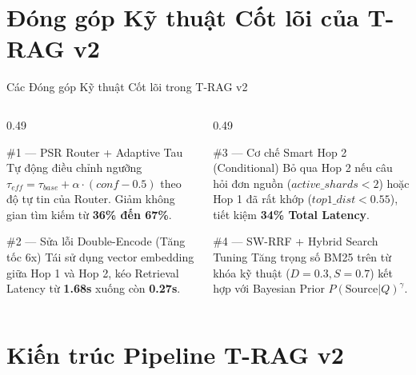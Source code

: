 \documentclass[aspectratio=169,10pt]{beamer}
\begin{document}
\section{Đóng góp Kỹ thuật Cốt lõi của T-RAG v2}

\begin{frame}{Các Đóng góp Kỹ thuật Cốt lõi trong T-RAG v2}
\small
\begin{columns}[T]
\begin{column}{0.49\textwidth}
\begin{block}{\#1 --- PSR Router + Adaptive Tau}
Tự động điều chỉnh ngưỡng $\tau_{eff} = \tau_{base} + \alpha \cdot (conf - 0.5)$ theo độ tự tin của Router. Giảm không gian tìm kiếm từ \textbf{36\% đến 67\%}.
\end{block}

\vspace{0.1cm}
\begin{block}{\#2 --- Sửa lỗi Double-Encode (Tăng tốc 6x)}
Tái sử dụng vector embedding giữa Hop 1 và Hop 2, kéo Retrieval Latency từ \textbf{1.68s} xuống còn \textbf{0.27s}.
\end{block}
\end{column}

\begin{column}{0.49\textwidth}
\begin{block}{\#3 --- Cơ chế Smart Hop 2 (Conditional)}
Bỏ qua Hop 2 nếu câu hỏi đơn nguồn ($active\_shards < 2$) hoặc Hop 1 đã rất khớp ($top1\_dist < 0.55$), tiết kiệm \textbf{34\% Total Latency}.
\end{block}

\vspace{0.1cm}
\begin{block}{\#4 --- SW-RRF + Hybrid Search Tuning}
Tăng trọng số BM25 trên từ khóa kỹ thuật ($D=0.3, S=0.7$) kết hợp với Bayesian Prior $P(\text{Source}|Q)^\gamma$.
\end{block}
\end{column}
\end{columns}
\end{frame}

\section{Kiến trúc Pipeline T-RAG v2}
\end{document}
